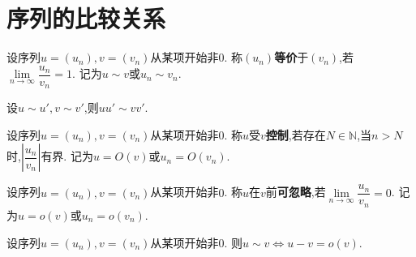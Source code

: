 \section{序列的比较关系}\label{sec:sequences_comparison}

\begin{deff}
    设序列$u=(u_n),v=(v_n)$从某项开始非$0$.
    称$(u_n)$\textbf{等价}于$(v_n)$,若$\lim\limits_{n\to\infty}\dfrac{u_n}{v_n}=1$.
    记为$u \sim v$或$u_n \sim v_n$.
\end{deff}

\begin{prop}
    设$u \sim u',v \sim v'$,则$uu' \sim vv'$.
\end{prop}

\begin{deff}
    设序列$u=(u_n),v=(v_n)$从某项开始非$0$.
    称$u$受$v$\textbf{控制},若存在$N \in \mathbb{N}$,当$n>N$时,$\left\lvert \dfrac{u_n}{v_n} \right\rvert$有界.
    记为$u = O(v)$或$u_n = O(v_n)$.
\end{deff}

\begin{deff}
    设序列$u=(u_n),v=(v_n)$从某项开始非$0$.
    称$u$在$v$前\textbf{可忽略},若$\lim\limits_{n\to\infty}\dfrac{u_n}{v_n}=0$.
    记为$u = o(v)$或$u_n = o(v_n)$.
\end{deff}

\begin{prop}
    设序列$u=(u_n),v=(v_n)$从某项开始非$0$.
    则$u \sim v \Leftrightarrow u-v=o(v)$.
\end{prop}